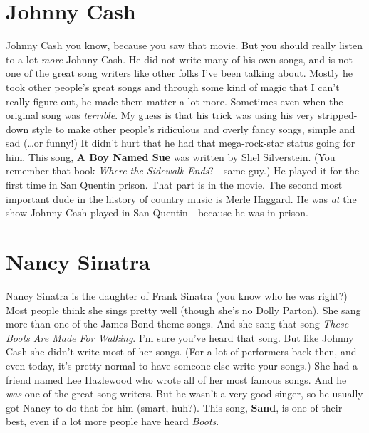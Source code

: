 \documentclass[letterpaper,single]{article}
\begin{document}
\section{Johnny Cash}
Johnny Cash you know, because you saw that movie.
But you should really listen to a lot \emph{more} Johnny Cash. 
He did not write many of his own songs, and is not one of the great song writers like other folks I've been talking about. 
Mostly he took other people's great songs and through some kind of magic that I can't really figure out, he made them matter a lot more.
Sometimes even when the original song was \emph{terrible}. 
My guess is that his trick was using his very stripped-down style to make other people's ridiculous and overly fancy songs, simple and sad (\ldots or funny!)
It didn't hurt that he had that mega-rock-star status going for him.
This song, \textbf{A Boy Named Sue} was written by Shel Silverstein. 
(You remember that book \emph{Where the Sidewalk Ends}?---same guy.) 
He played it for the first time in San Quentin prison. 
That part is in the movie.
The second most important dude in the history of country music is Merle Haggard. He was \emph{at} the show Johnny Cash played in San Quentin---because he was in prison.

\section{Nancy Sinatra}
Nancy Sinatra is the daughter of Frank Sinatra (you know who he was right?) 
Most people think she sings pretty well (though she's no Dolly Parton). 
She sang more than one of the James Bond theme songs. 
And she sang that song \emph{These Boots Are Made For Walking}. 
I'm sure you've heard that song. 
But like Johnny Cash she didn't write most of her songs. 
(For a lot of performers back then, and even today, it's pretty normal to have someone else write your songs.)
She had a friend named Lee Hazlewood who wrote all of her most famous songs. 
And he \emph{was} one of the great song writers. 
But he wasn't a very good singer, so he usually got Nancy to do that for him (smart, huh?). 
This song, \textbf{Sand}, is one of their best, even if a lot more people have heard \emph{Boots}.
\end{document}
